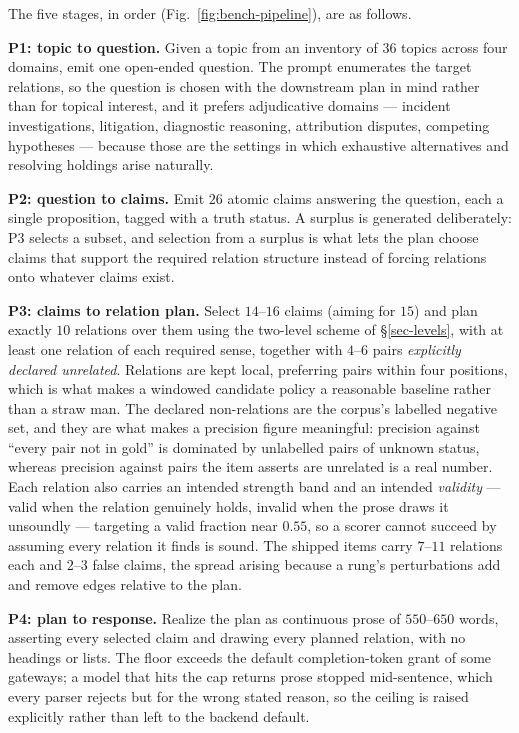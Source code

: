 

The five stages, in order (Fig.~\ref{fig:bench-pipeline}), are as follows.

\textbf{P1: topic to question.} Given a topic from an inventory of $36$ topics across four domains, emit
one open-ended question. The prompt enumerates the target relations, so the question is chosen with the
downstream plan in mind rather than for topical interest, and it prefers adjudicative domains ---
incident investigations, litigation, diagnostic reasoning, attribution disputes, competing hypotheses ---
because those are the settings in which exhaustive alternatives and resolving holdings arise naturally.

\textbf{P2: question to claims.} Emit $26$ atomic claims answering the question, each a single
proposition, tagged with a truth status. A surplus is generated deliberately: P3 selects a subset, and
selection from a surplus is what lets the plan choose claims that support the required relation structure
instead of forcing relations onto whatever claims exist.

\textbf{P3: claims to relation plan.} Select $14$--$16$ claims (aiming for $15$) and plan exactly $10$
relations over them using the two-level scheme of \S\ref{sec-levels}, with at least one relation of each
required sense, together with $4$--$6$ pairs \emph{explicitly declared unrelated}. Relations are kept
local, preferring pairs within four positions, which is what makes a windowed candidate policy a
reasonable baseline rather than a straw man. The declared non-relations are the corpus's labelled negative
set, and they are what makes a precision figure meaningful: precision against ``every pair not in gold''
is dominated by unlabelled pairs of unknown status, whereas precision against pairs the item asserts are
unrelated is a real number. Each relation also carries an intended strength band and an intended
\emph{validity} --- valid when the relation genuinely holds, invalid when the prose draws it unsoundly ---
targeting a valid fraction near $0.55$, so a scorer cannot succeed by assuming every relation it finds is
sound. The shipped items carry $7$--$11$ relations each and $2$--$3$ false claims, the spread arising
because a rung's perturbations add and remove edges relative to the plan.

\textbf{P4: plan to response.} Realize the plan as continuous prose of $550$--$650$ words, asserting
every selected claim and drawing every planned relation, with no headings or lists. The floor exceeds
the default completion-token grant of some gateways; a model that hits the cap returns prose stopped
mid-sentence, which every parser rejects but for the wrong stated reason, so the ceiling is raised
explicitly rather than left to the backend default.

